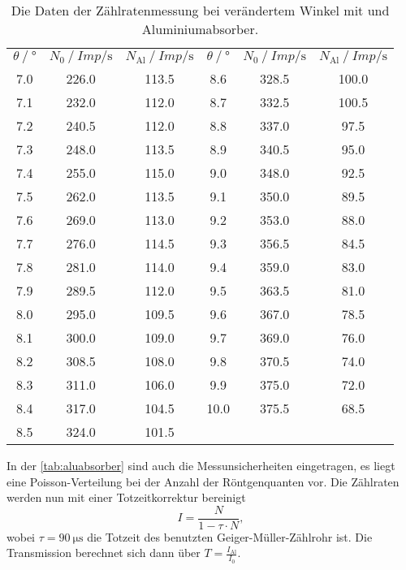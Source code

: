   \begin{table}
    \centering
    \caption{Die Daten der Zählratenmessung bei verändertem Winkel mit und Aluminiumabsorber.}
    \label{tab:aluabsorber}
    \begin{tabular}{c c c c c c } %
      \toprule
      $\theta \mathbin{/} \si{\degree}$ & $N_0 \mathbin{/} \si{Imp\per\second} $ & $ N_{\text{Al}} \mathbin{/} \si{Imp\per\second}  $ & %
      $\theta \mathbin{/} \si{\degree}$ & $N_0 \mathbin{/} \si{Imp\per\second} $ & $ N_{\text{Al}} \mathbin{/} \si{Imp\per\second}  $ \\ %
      \cmidrule(lr){1-3} \cmidrule(lr){4-6}
      7.0 & 	226.0 & 	113.5 &   8.6	 &  328.5 &  100.0  \\
      7.1 & 	232.0 & 	112.0 &   8.7	 &  332.5 &  100.5  \\
      7.2 & 	240.5 & 	112.0 &   8.8	 &  337.0 &   97.5  \\
      7.3 & 	248.0 & 	113.5 &   8.9	 &  340.5 & 	95.0  \\
      7.4 & 	255.0 & 	115.0 &   9.0	 &  348.0 & 	92.5  \\
      7.5 & 	262.0 & 	113.5 &   9.1	 &  350.0 & 	89.5  \\
      7.6 & 	269.0 & 	113.0 &   9.2	 &  353.0 & 	88.0  \\
      7.7 & 	276.0 & 	114.5 &   9.3	 &  356.5 & 	84.5  \\
      7.8 & 	281.0 & 	114.0 &   9.4	 &  359.0 & 	83.0  \\
      7.9 & 	289.5 & 	112.0 &   9.5	 &  363.5 & 	81.0  \\
      8.0 & 	295.0 & 	109.5 &   9.6	 &  367.0 & 	78.5  \\
      8.1 & 	300.0 & 	109.0 &   9.7	 &  369.0 & 	76.0  \\
      8.2 & 	308.5 & 	108.0 &   9.8	 &  370.5 & 	74.0  \\
      8.3 & 	311.0 & 	106.0 &   9.9	 &  375.0 & 	72.0  \\
      8.4 & 	317.0 & 	104.5 &   10.0 &  375.5 &   68.5  \\
      8.5 & 	324.0 & 	101.5 \\
      \bottomrule        
    \end{tabular}
  \end{table}

  \noindent In der \autoref{tab:aluabsorber} sind auch die Messunsicherheiten eingetragen, es liegt eine Poisson-Verteilung bei der Anzahl der Röntgenquanten 
  vor. Die Zählraten werden nun mit einer Totzeitkorrektur bereinigt
  \begin{equation*}
    I = \frac{N}{1 - \tau \cdot N}, 
  \end{equation*}
  wobei $\tau = \SI{90}{\micro\second}$ die Totzeit des benutzten Geiger-Müller-Zählrohr ist. Die Transmission berechnet sich dann über $T = \frac{I_{\text{Al}}}{I_0}$.

